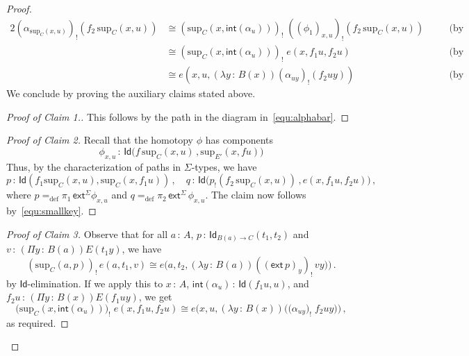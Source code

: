 \documentclass[10pt,a4paper,oneside,reqno]{amsart}
\numberwithin{equation}{section}
\def\noqed{\renewcommand{\qedsymbol}{}}
\theoremstyle{mythm}
\theoremstyle{mydef}
\theoremstyle{myrmk}
\newcommand{\defeq}{=_{\mathrm{def}}}
\newcommand{\co}{\,{:}\,}
\newcommand{\iso}{\cong}
\newcommand{\ext}{\mathsf{ext}}
\renewcommand{\int}{\mathsf{int}}
\newcommand{\Id}{\mathsf{Id}}
\renewcommand{\sup}{\mathrm{sup}}
\begin{document}
\begin{proof}
 \begin{alignat*}{2} 
 (\alpha_{\sup_C(x,u)})_{!} ( f_2 \, \sup_C(x,u) ) 
 &  \iso  
 (\sup_C(x, \int(\alpha_u)))_{!} \;  ((\phi_1)_{x,u})_{!}  (f_2 \, \sup_C(x,u) )  
 & \quad &  \text{(by Claim 1)} \\ 
& \iso  
 (\sup_C(x, \int(\alpha_u)))_{!} \;   e(x, f_1 u, f_2 u)  
 & \quad &  \text{(by Claim 2)} \\
&  \iso e(x, u, (\lambda y \co B(x)) (\alpha_{uy})_{!}( f_2 u y))  
     & \quad  & \text{(by Claim 3).} 
  \end{alignat*} 
We conclude by proving the auxiliary claims stated above.

\begin{proof}[Proof of Claim 1.]  This follows by the path in the diagram in~\eqref{equ:alphabar}. \noqed
\end{proof}  



\begin{proof}[Proof of Claim 2] Recall that the homotopy $\phi$ has components 
 \[
\phi_{x,u} \co \Id \big( f  \,  \sup_C(x,u) \, ,  \sup_{E'}(x, fu) \big)
\]
Thus, by the characterization of paths in $\Sigma$-types, we have
\[
p  \co \Id( f_1 \sup_C(x,u) , \sup_C(x, f_1 u)) \, , \quad
q \co  
\Id\big( p_{!} ( f_2 \, \sup_C(x,u))    \, ,     e(x, f_1 u, f_2 u) \big) \, ,
 \]   
 where $p \defeq \pi_1 \, \ext^\Sigma \phi_{x,u}$ and $q \defeq \pi_2 \, \ext^\Sigma \, \phi_{x,u}$. 
 The claim now follows by~\eqref{equ:smallkey}. 
 \noqed
\end{proof}

\vspace{-1ex}
 
 \begin{proof}[Proof of Claim 3] 
Observe that for all $a \co A$, $p \co \Id_{B(a) \to C}(t_1, t_2)$  and 
$v \co (\Pi y \co B(a))E(t_1y)$, we have
\[ 
(\sup_C(a,p))_{!}\, e(a,t_1,v)  \iso 
e \big( a, t_2,  (\lambda y \co B(a)) ( (\ext \, p)_y )_{!}\, v y \big) \big)   \, . 
\]
by $\Id$-elimination. If we apply this to $x \co A$, $\int(\alpha_u) \co \Id( f_1 u, u)$, and $f_2 u \co
(\Pi y \co B(x)) E(f_1 u y)$, we get
\[
\big( \sup_C(x,\int(\alpha_u)) \big)_{!} \; e(x, f_1 u , f_2 u) \iso 
e\big(x, u , (\lambda y \co B(x)) \big( (\alpha_{u y} \big)_{!} \;  f_2 u y  \big) \big) 
 \, ,
\]
as required.   \end{proof}  \noqed
\end{proof}

\vspace{-0.8cm}
\end{document}
